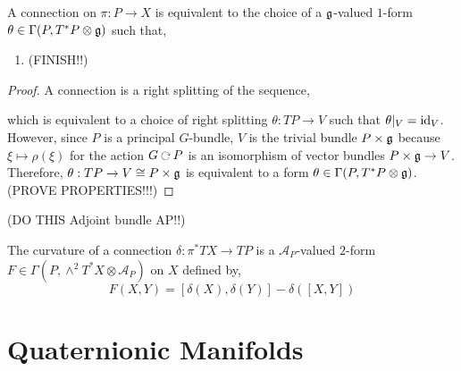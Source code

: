 \documentclass[12pt]{extarticle}
\begin{document}
\begin{lemma}
A connection on $\pi : P \to X$ is equivalent to the choice of a $\mathfrak{g}$-valued $1$-form $\theta \in \Gamma(P, T^*P \otimes \mathfrak{g})$ such that,
\begin{enumerate}
\item (FINISH!!)
\end{enumerate}
\end{lemma}

\begin{proof}
A connection is a right splitting of the sequence,
\begin{center}
\end{center}
which is equivalent to a choice of right splitting $\theta : TP \to V$ such that $\theta|_V = \mathrm{id}_{V}$. However, since $P$ is a principal $G$-bundle, $V$ is the trivial bundle $P \times \mathfrak{g}$ because $\xi \mapsto \rho(\xi)$ for the action $G \acts P$ is an isomorphism of vector bundles $P \times \mathfrak{g} \to V$. Therefore, $\theta : TP \to V \cong P \times \mathfrak{g}$ is equivalent to a form $\theta \in \Gamma(P, T^*P \otimes \mathfrak{g})$.
(PROVE PROPERTIES!!!)
\end{proof}

(DO THIS Adjoint bundle AP!!)

\newcommand{\A}{\mathcal{A}}

\begin{defn}
The curvature of a connection $\delta : \pi^* TX \to TP$ is a $\A_P$-valued $2$-form $F \in \Gamma(P, \wedge^2 T^* X \otimes \A_P)$ on $X$ defined by,
\[ F(X, Y) = [\delta(X), \delta(Y)] - \delta([X, Y]) \]
\end{defn}




\section{Quaternionic Manifolds}

\renewcommand{\H}{\mathbb{H}}
\renewcommand{\End}[2]{\mathrm{End}_{#1}\left(#2\right)}
\renewcommand{\Aut}[2]{\mathrm{Aut}_{#1}\left(#2\right)}
\newcommand{\GL}[1]{\mathrm{GL}\left(#1 \right)}
\end{document}
